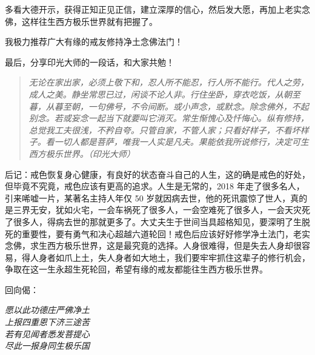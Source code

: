 多看大德开示，获得正知正见正信，建立深厚的信心，然后发大愿，再加上老实念佛，这样往生西方极乐世界就有把握了。

我极力推荐广大有缘的戒友修持净土念佛法门！

最后，分享印光大师的一段话，和大家共勉！

\begin{quote}\it
    无论在家出家，必须上敬下和，忍人所不能忍，行人所不能行。代人之劳，成人之美。静坐常思已过，闲谈不论人非。行住坐卧，穿衣吃饭，从朝至暮，从暮至朝，一句佛号，不令间断。或小声念，或默念。除念佛外，不起别念。若或妄念一起当下就要叫它消灭。常生惭愧心及忏悔心。纵有修持，总觉我工夫很浅，不矜自夸。只管自家，不管人家；只看好样子，不看坏样子。看一切人都是菩萨，唯我一人实是凡夫。果能依我所说修行，决定可生西方极乐世界。（印光大师）
\end{quote}

后记：戒色恢复身心健康，有良好的状态奋斗自己的人生，这的确是戒色的好处，但毕竟不究竟，戒色应该有更高的追求。人生是无常的，2018 年走了很多名人，引来唏嘘一片，某著名主持人年仅 50 岁就因病去世，他的死讯震惊了世人，真的是三界无安，犹如火宅，一会车祸死了很多人，一会空难死了很多人，一会天灾死了很多人，得病去世的那就更多了。大丈夫生于世间当具超格知见，要深明了生脱死的重要性，要有勇气和决心超越六道轮回！戒色后应该好好修学净土法门，老实念佛，求生西方极乐世界，这是最究竟的选择。人身很难得，但是失去人身却很容易，得人身者如爪上土，失人身者如大地土，我们要牢牢抓住这辈子的修行机会，争取在这一生永超生死轮回，希望有缘的戒友都能往生西方极乐世界。

回向偈：

\begin{center}\it
    愿以此功德\quad 庄严佛净土 \\ 上报四重恩\quad 下济三途苦 \\ 若有见闻者\quad 悉发菩提心 \\ 尽此一报身\quad 同生极乐国
\end{center}
